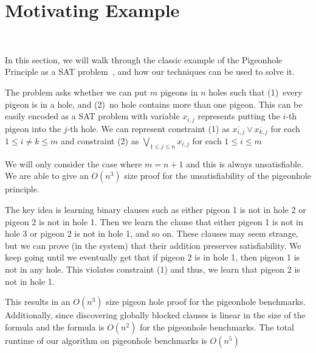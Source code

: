 \section{Motivating Example}~\label{sec:motivatex}




In this section, we will walk through the classic example of the Pigeonhole Principle as a SAT problem~\cite{}, and how our techniques can be used to solve it.

The problem asks whether we can put $m$ pigeons in $n$ holes such that (1)~every pigeon is in a hole, and (2)~no hole contains more than one pigeon. This can be easily encoded as a SAT problem with variable $x_{i, j}$ represents putting the $i$-th pigeon into the $j$-th hole. We can represent constraint (1) as $\overline{x_{i, j}} \lor \overline{x_{k, j}}$ for each $ 1 \leq i \neq k \leq m$ and constraint (2) as $\bigvee_{1 \leq j \leq n} x_{i, j}$ for each $1 \leq i \leq m$

We will only consider the case where $m = n + 1$ and this is always unsatisfiable. We are able to give an $O(n^3)$ size proof for the unsatisfiability of the pigeonhole principle.

The key idea is learning binary clauses such as either pigeon 1 is not in hole 2 or pigeon 2 is not in hole 1. Then we learn the clause that either pigeon 1 is not in hole 3 or pigeon 2 is not in hole 1, and so on. These clauses may seem strange, but we can prove (in the \pr system) that their addition preserves satisfiability. We keep going until we eventually get that if pigeon 2 is in hole 1, then pigeon 1 is not in any hole. This violates constraint (1) and thus, we learn that pigeon 2 is not in hole 1. 


This results in an $O(n^3)$ size pigeon hole proof for the pigeonhole benchmarks. Additionally, since discovering globally blocked clauses is linear in the size of the formula and the formula is $O(n^2)$ for the pigeonhole benchmarks. The total runtime of our algorithm on pigeonhole benchmarks is $O(n^5)$

